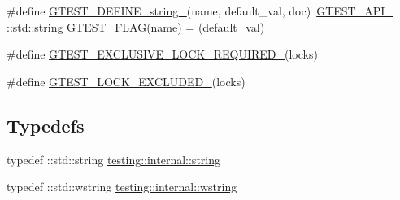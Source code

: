 \begin{DoxyCompactItemize}
$$\item 
\#define \mbox{\hyperlink{_obj__test_2lib_2googletest-release-1_88_81_2googletest_2include_2gtest_2internal_2gtest-port_8h_a885e18fe217a6e85553d408b99252c12}{G\+T\+E\+S\+T\+\_\+\+D\+E\+F\+I\+N\+E\+\_\+string\+\_\+}}(name,  default\+\_\+val,  doc)~\mbox{\hyperlink{_obj__test_2lib_2googletest-release-1_88_81_2googletest_2include_2gtest_2internal_2gtest-port_8h_aa73be6f0ba4a7456180a94904ce17790}{G\+T\+E\+S\+T\+\_\+\+A\+P\+I\+\_\+}} \+::std\+::string \mbox{\hyperlink{_obj__test_2lib_2googletest-release-1_88_81_2googletest_2include_2gtest_2internal_2gtest-port_8h_a828f4e34a1c4b510da50ec1563e3562a}{G\+T\+E\+S\+T\+\_\+\+F\+L\+AG}}(name) = (default\+\_\+val)
\item 
\#define \mbox{\hyperlink{_obj__test_2lib_2googletest-release-1_88_81_2googletest_2include_2gtest_2internal_2gtest-port_8h_a149f693bd59fa1bc937af54c0cdcb32f}{G\+T\+E\+S\+T\+\_\+\+E\+X\+C\+L\+U\+S\+I\+V\+E\+\_\+\+L\+O\+C\+K\+\_\+\+R\+E\+Q\+U\+I\+R\+E\+D\+\_\+}}(locks)
\item 
\#define \mbox{\hyperlink{_obj__test_2lib_2googletest-release-1_88_81_2googletest_2include_2gtest_2internal_2gtest-port_8h_a69abff5a4efdd07bd5faebe3dd318d06}{G\+T\+E\+S\+T\+\_\+\+L\+O\+C\+K\+\_\+\+E\+X\+C\+L\+U\+D\+E\+D\+\_\+}}(locks)
\end{DoxyCompactItemize}
\subsection*{Typedefs}
\begin{DoxyCompactItemize}
\item 
typedef \+::std\+::string \mbox{\hyperlink{namespacetesting_1_1internal_a8e8ff5b11e64078831112677156cb111}{testing\+::internal\+::string}}
\item 
typedef \+::std\+::wstring \mbox{\hyperlink{namespacetesting_1_1internal_a3f543179329c353aee1d7b54a9a8e335}{testing\+::internal\+::wstring}}
\end{DoxyCompactItemize}

